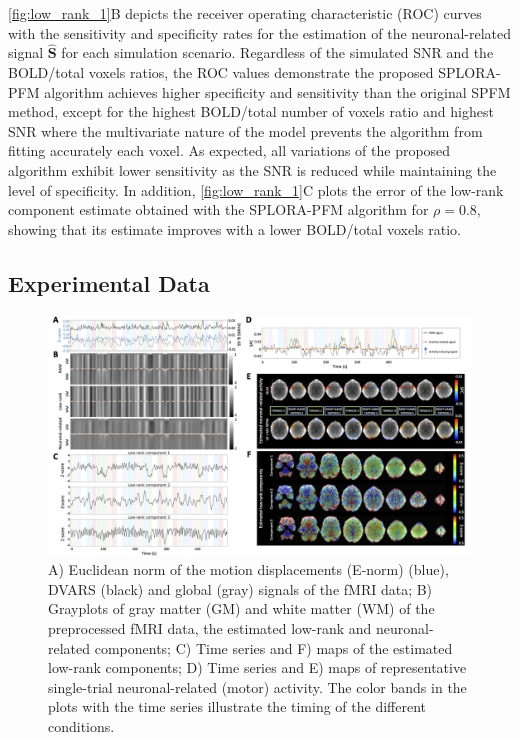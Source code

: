 \cref{fig:low_rank_1}B depicts the receiver operating characteristic (ROC)
curves with the sensitivity and specificity rates for the estimation of the
neuronal-related signal $\mathbf{\hat{S}}$ for each simulation scenario.
Regardless of the simulated SNR and the BOLD/total voxels ratios, the ROC values
demonstrate the proposed SPLORA-PFM algorithm achieves higher specificity and
sensitivity than the original SPFM method, except for the highest BOLD/total
number of voxels ratio and highest SNR where the multivariate nature of the
model prevents the algorithm from fitting accurately each voxel. As expected,
all variations of the proposed algorithm exhibit lower sensitivity as the SNR is
reduced while maintaining the level of specificity. In addition,
\cref{fig:low_rank_1}C plots the error of the low-rank component estimate
obtained with the SPLORA-PFM algorithm for $\rho = 0.8$, showing that its
estimate improves with a lower BOLD/total voxels ratio.

\subsection{Experimental Data}

\begin{figure}[th!]
    \centering
    \includegraphics[width=\textwidth]{figures/low_rank/figure_2_no_G.png}
    \caption{A) Euclidean norm of the motion displacements (E-norm) (blue),
    DVARS (black) and global (gray) signals of the fMRI data; B) Grayplots of
    gray matter (GM) and white matter (WM) of the preprocessed fMRI
    data, the estimated low-rank and neuronal-related components; C) Time series
    and F) maps of the estimated low-rank components; D) Time series and E) maps
    of representative single-trial neuronal-related (motor) activity. The color
    bands in the plots with the time series illustrate the timing of the
    different conditions.}
    \label{fig:low_rank_2}
\end{figure}


